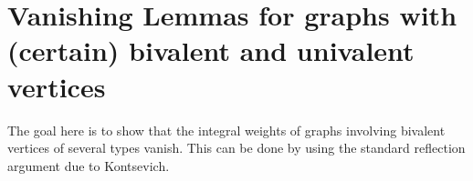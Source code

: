 \documentclass[a4paper]{amsart}
\theoremstyle{plain}
\newtheorem{lemma}[thm]{Lemma}
\theoremstyle{definition}
\newcommand{\alg}[1]{\mathfrak{{#1}}}
\newcommand{\R}{{\mathbb{R}}}
\begin{document}
\section{Vanishing Lemmas for graphs with (certain) bivalent and univalent vertices}
The goal here is to show that the integral weights of graphs involving bivalent vertices of several types vanish. This can be done by using the standard reflection argument due to Kontsevich.

\end{document}
